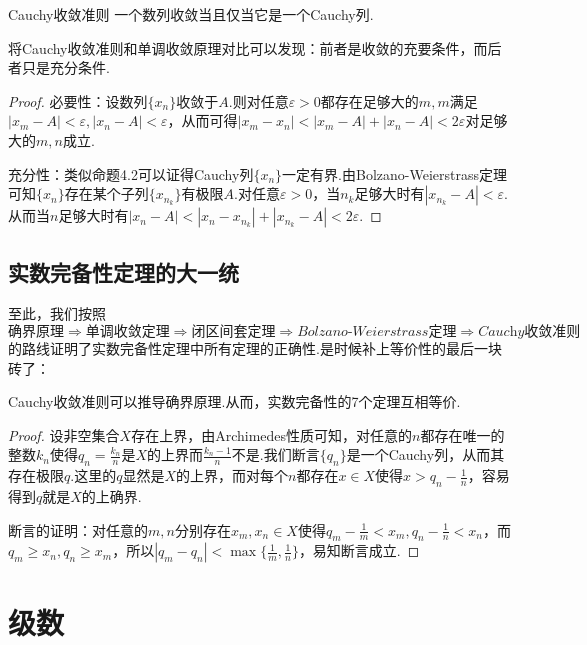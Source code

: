\begin{theorem}{Cauchy收敛准则}
	一个数列收敛当且仅当它是一个Cauchy列.
\end{theorem}
\begin{remark}
	将Cauchy收敛准则和单调收敛原理对比可以发现：前者是收敛的充要条件，而后者只是充分条件.
\end{remark}
\begin{proof}
	必要性：设数列$\{ x_n \}$收敛于$A$.则对任意$\varepsilon >0$都存在足够大的$m,m$满足$|x_m-A|<\varepsilon ,|x_n-A|<\varepsilon$，从而可得$|x_m-x_n|<|x_m-A|+|x_n-A|<2\varepsilon$对足够大的$m,n$成立.
	
	充分性：类似命题4.2可以证得Cauchy列$\{ x_n \}$一定有界.由Bolzano-Weierstrass定理可知$\{ x_n \}$存在某个子列$\{ x_{n_k} \}$有极限$A$.对任意$\varepsilon >0$，当$n_k$足够大时有$|x_{n_k} - A|<\varepsilon$.从而当$n$足够大时有$|x_n-A|<|x_n-x_{n_k}|+|x_{n_k}-A|<2\varepsilon$.
\end{proof}

\subsection{实数完备性定理的大一统}

至此，我们按照$$\textit{确界原理} \Rightarrow \textit{单调收敛定理} \Rightarrow \textit{闭区间套定理} \Rightarrow \textit{Bolzano-Weierstrass定理} \Rightarrow \textit{Cauchy收敛准则}$$的路线证明了实数完备性定理中所有定理的正确性.是时候补上等价性的最后一块砖了：

\begin{proposition}{}
	Cauchy收敛准则可以推导确界原理.从而，实数完备性的7个定理互相等价.
\end{proposition}
\begin{proof}
	设非空集合$X$存在上界，由Archimedes性质可知，对任意的$n$都存在唯一的整数$k_n$使得$q_n=\frac{k_n}{n}$是$X$的上界而$\frac{k_n-1}{n}$不是.我们断言$\{ q_n \}$是一个Cauchy列，从而其存在极限$q$.这里的$q$显然是$X$的上界，而对每个$n$都存在$x \in X$使得$x>q_n-\frac{1}{n}$，容易得到$q$就是$X$的上确界.
	
	断言的证明：对任意的$m,n$分别存在$x_m,x_n \in X$使得$q_m-\frac{1}{m} < x_m,q_n-\frac{1}{n} < x_n$，而$q_m \geq x_n,q_n \geq x_m$，所以$|q_m-q_n|<\max \{ \frac{1}{m},\frac{1}{n} \}$，易知断言成立.
\end{proof}

\section{级数}

